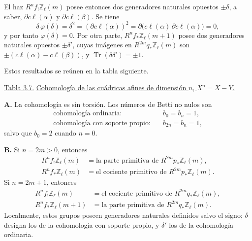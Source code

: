 \begin{center}
\footnotesize
{}
\end{center}


El haz $R^nf_!\mathbb Z_\ell(m)$ posee entonces dos generadores naturales
opuestos $\pm\delta$, a saber,
$\partial c\ell(\alpha)$ y $\partial c\ell(\beta)$. Se tiene
\begin{equation*}
\delta\,\varphi(\delta)=\delta^2
=(\partial c\ell(\alpha))^2
=\partial\bigl(c\ell(\alpha)\,\partial c\ell(\alpha)\bigr)=0,
\end{equation*}
y por tanto $\varphi(\delta)=0$. Por otra parte,
$R^nf_*\mathbb Z_\ell(m+1)$ posee dos generadores naturales opuestos
$\pm\delta'$, cuyas imágenes en $R^{2m}q_*\mathbb Z_\ell(m)$ son
$\pm(c\ell(\alpha)-c\ell(\beta))$, y
$\operatorname{Tr}(\delta\delta')=\pm1$.

\pageoriginale

Estos resultados se reúnen en la tabla siguiente.

\medskip
\noindent\underline{Tabla 3.7.}\quad
\underline{Cohomología de las cuádricas afines de dimensión $n$,
$X^o=X-Y$.}

\medskip
\noindent\textbf{A.} La cohomología es sin torsión. Los números de Betti
no nulos son
\begin{align*}
\text{cohomología ordinaria:}\quad &b_0=b_n=1,\\
\text{cohomología con soporte propio:}\quad &b_{2n}=b_n=1,
\end{align*}
salvo que $b_0=2$ cuando $n=0$.

\medskip
\noindent\textbf{B.} Si $n=2m>0$, entonces
\begin{align*}
R^nf_!\mathbb Z_\ell(m)
  &=\text{la parte primitiva de }R^{2m}p_*\mathbb Z_\ell(m),\\
R^nf_*\mathbb Z_\ell(m)
  &=\text{el cociente primitivo de }R^{2m}p_*\mathbb Z_\ell(m).
\end{align*}
Si $n=2m+1$, entonces
\begin{align*}
R^nf_!\mathbb Z_\ell(m)
  &=\text{el cociente primitivo de }R^{2m}q_*\mathbb Z_\ell(m),\\
R^nf_*\mathbb Z_\ell(m+1)
  &=\text{la parte primitiva de }R^{2m}q_*\mathbb Z_\ell(m).
\end{align*}
Localmente, estos grupos poseen generadores naturales definidos salvo el
signo; $\delta$ designa los de la cohomología con soporte propio, y
$\delta'$ los de la cohomología ordinaria.

